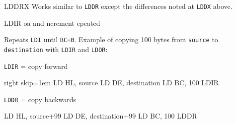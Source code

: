 \begin{basedescript}{
	\desclabelstyle{\multilinelabel}
	\desclabelwidth{3cm}}
\begin{DetailItem}{LDDRX}{\DetailItemZXN}
		Works similar to {\tt LDDR} except the differences noted at {\tt LDDX} above.

		\begin{DetailEffects}
			\FlagsLDDRX
		\end{DetailEffects}
					
		\begin{DetailTiming}
			\DetailTimeRegular[{\tt BC}=0]{4}{16}
			\DetailTimeRegular[{\tt BC}$\neq$0]{5}{21}
		\end{DetailTiming}

	\end{DetailItem}


	\begin{DetailItem}{LDIR}{}
		{oa and ncrement epeated}		
		{\SymLDIR}

		Repeats {\tt LDI} until {\tt BC=0}. Example of copying 100 bytes from {\tt source} to {\tt destination} with {\tt LDIR} and {\tt LDDR}:

		\begin{multicols}{2}
			{\tt LDIR} = copy forward
			\begin{tcblisting}{right skip=1em}
LD HL, source
LD DE, destination
LD BC, 100
LDIR
			\end{tcblisting}
			
			\columnbreak
			{\tt LDDR} = copy backwards
			\begin{tcblisting}{}
LD HL, source+99
LD DE, destination+99
LD BC, 100
LDDR
			\end{tcblisting}
		\end{multicols}

		\begin{DetailEffects}
			\FlagsLDIR
		\end{DetailEffects}
				
		\begin{DetailTiming}
		\end{DetailTiming}


\end{DetailItem}
\end{basedescript}
